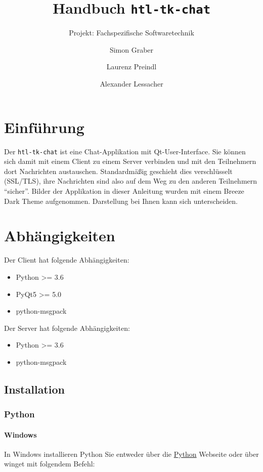 \documentclass[a4paper,ngerman,headsepline, titlepage=firstiscover]{scrartcl}
\begin{document}
\title{Handbuch \texttt{htl-tk-chat}}
\subtitle{Projekt: Fachspezifische Softwaretechnik}
\author{Simon Graber \and Laurenz Preindl \and Alexander Lessacher}

\maketitle
\tableofcontents
\newpage

\section{Einführung}
Der \texttt{htl-tk-chat} ist eine Chat-Applikation mit Qt-User-Interface. Sie können sich damit mit einem Client zu einem Server verbinden und mit den Teilnehmern dort Nachrichten austauschen. Standardmäßig geschieht dies verschlüsselt (SSL/TLS), ihre Nachrichten sind also auf dem Weg zu den anderen Teilnehmern \enquote{sicher}. Bilder der Applikation in dieser Anleitung wurden mit einem Breeze Dark Theme aufgenommen. Darstellung bei Ihnen kann sich unterscheiden.

\section{Abhängigkeiten}
Der Client hat folgende Abhängigkeiten:
\begin{itemize}
 \item Python >= 3.6
 \item PyQt5 >= 5.0
 \item python-msgpack
\end{itemize}

\noindent Der Server hat folgende Abhängigkeiten:
\begin{itemize}
 \item Python >= 3.6
 \item python-msgpack
\end{itemize}

\subsection{Installation}
\subsubsection{Python}
\paragraph{Windows} In Windows installieren Python Sie entweder über die \href{https://python.org}{Python} Webseite oder über winget mit folgendem Befehl:
\end{document}
